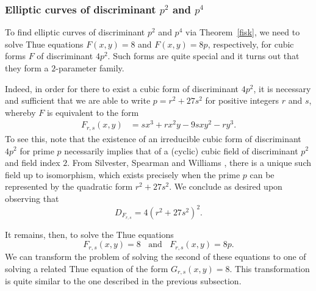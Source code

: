 \subsubsection{Elliptic curves of discriminant $p^2$ and $p^4$} \label{pinky}
To find elliptic curves of discriminant $p^2$ and $p^4$ via Theorem~\ref{fisk}, we need to 
solve Thue equations $F(x,y)=8$ and $F(x,y)=8p$, respectively, for cubic forms $F$ of discriminant 
$4p^2$. Such forms are quite special and it turns out that they form a $2$-parameter family.

Indeed, in order for there to exist a cubic form of discriminant $4 p^2$, it is necessary and 
sufficient that we are able to write $p=r^2+27 s^2$ for positive integers $r$ and $s$, whereby $F$ 
is equivalent to the form
\begin{align*}
F_{r,s} (x,y) &= s x^3 + r x^2y - 9 s x y^2 - r y^3.
\end{align*}
To see this, note that the existence of an irreducible cubic form of discriminant $4p^2$ for prime $p$ necessarily implies that of a (cyclic) cubic field of discriminant $p^2$ and field index $2$. From Silvester, Spearman and Williams \cite{SSW}, there is a unique such field up to isomorphism, which exists precisely when the prime $p$ can be represented by the quadratic form $r^2+27 s^2$. We conclude as desired upon observing that
$$
D_{F_{r,s}} = 4 \left( r^2+27 s^2 \right)^2.
$$

It remains, then, to solve the Thue equations
$$
F_{r,s} (x,y) =8 \; \; \mbox{ and } \; \;   F_{r,s} (x,y)=8 p.
$$
We can transform the problem of solving the second of these equations to one of solving a related Thue 
equation of the form $G_{r,s}(x,y)=8$. This transformation is quite similar to the one described in 
the previous subsection. 

